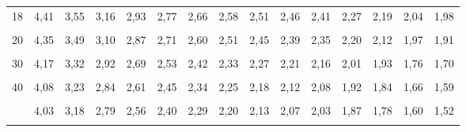 \documentclass[
  ngerman,
]{article}
\begin{document}
\begin{table}[!h]
{\begin{tabular}{>{}r|rrrrrrrrrrrrrr}
18 & 4,41 & 3,55 & 3,16 & 2,93 & 2,77 & 2,66 & 2,58 & 2,51 & 2,46 & 2,41 & 2,27 & 2,19 & 2,04 & 1,98\\
\cellcolor{gray!6}{19} & \cellcolor{gray!6}{4,38} & \cellcolor{gray!6}{3,52} & \cellcolor{gray!6}{3,13} & \cellcolor{gray!6}{2,90} & \cellcolor{gray!6}{2,74} & \cellcolor{gray!6}{2,63} & \cellcolor{gray!6}{2,54} & \cellcolor{gray!6}{2,48} & \cellcolor{gray!6}{2,42} & \cellcolor{gray!6}{2,38} & \cellcolor{gray!6}{2,23} & \cellcolor{gray!6}{2,16} & \cellcolor{gray!6}{2,00} & \cellcolor{gray!6}{1,94}\\
20 & 4,35 & 3,49 & 3,10 & 2,87 & 2,71 & 2,60 & 2,51 & 2,45 & 2,39 & 2,35 & 2,20 & 2,12 & 1,97 & 1,91\\
\addlinespace
\cellcolor{gray!6}{25} & \cellcolor{gray!6}{4,24} & \cellcolor{gray!6}{3,39} & \cellcolor{gray!6}{2,99} & \cellcolor{gray!6}{2,76} & \cellcolor{gray!6}{2,60} & \cellcolor{gray!6}{2,49} & \cellcolor{gray!6}{2,40} & \cellcolor{gray!6}{2,34} & \cellcolor{gray!6}{2,28} & \cellcolor{gray!6}{2,24} & \cellcolor{gray!6}{2,09} & \cellcolor{gray!6}{2,01} & \cellcolor{gray!6}{1,84} & \cellcolor{gray!6}{1,78}\\
30 & 4,17 & 3,32 & 2,92 & 2,69 & 2,53 & 2,42 & 2,33 & 2,27 & 2,21 & 2,16 & 2,01 & 1,93 & 1,76 & 1,70\\
\cellcolor{gray!6}{35} & \cellcolor{gray!6}{4,12} & \cellcolor{gray!6}{3,27} & \cellcolor{gray!6}{2,87} & \cellcolor{gray!6}{2,64} & \cellcolor{gray!6}{2,49} & \cellcolor{gray!6}{2,37} & \cellcolor{gray!6}{2,29} & \cellcolor{gray!6}{2,22} & \cellcolor{gray!6}{2,16} & \cellcolor{gray!6}{2,11} & \cellcolor{gray!6}{1,96} & \cellcolor{gray!6}{1,88} & \cellcolor{gray!6}{1,70} & \cellcolor{gray!6}{1,63}\\
40 & 4,08 & 3,23 & 2,84 & 2,61 & 2,45 & 2,34 & 2,25 & 2,18 & 2,12 & 2,08 & 1,92 & 1,84 & 1,66 & 1,59\\
\cellcolor{gray!6}{45} & \cellcolor{gray!6}{4,06} & \cellcolor{gray!6}{3,20} & \cellcolor{gray!6}{2,81} & \cellcolor{gray!6}{2,58} & \cellcolor{gray!6}{2,42} & \cellcolor{gray!6}{2,31} & \cellcolor{gray!6}{2,22} & \cellcolor{gray!6}{2,15} & \cellcolor{gray!6}{2,10} & \cellcolor{gray!6}{2,05} & \cellcolor{gray!6}{1,89} & \cellcolor{gray!6}{1,81} & \cellcolor{gray!6}{1,63} & \cellcolor{gray!6}{1,55}\\
\addlinespace
50 & 4,03 & 3,18 & 2,79 & 2,56 & 2,40 & 2,29 & 2,20 & 2,13 & 2,07 & 2,03 & 1,87 & 1,78 & 1,60 & 1,52\\
\cellcolor{gray!6}{60} & \cellcolor{gray!6}{4,00} & \cellcolor{gray!6}{3,15} & \cellcolor{gray!6}{2,76} & \cellcolor{gray!6}{2,53} & \cellcolor{gray!6}{2,37} & \cellcolor{gray!6}{2,25} & \cellcolor{gray!6}{2,17} & \cellcolor{gray!6}{2,10} & \cellcolor{gray!6}{2,04} & \cellcolor{gray!6}{1,99} & \cellcolor{gray!6}{1,84} & \cellcolor{gray!6}{1,75} & \cellcolor{gray!6}{1,56} & \cellcolor{gray!6}{1,48}\\

\end{tabular}}
\end{table}
\end{document}
